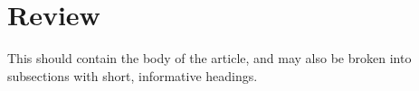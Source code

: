 \section{Review}

This should contain the body of the article, and may also be broken into subsections with short, informative headings.